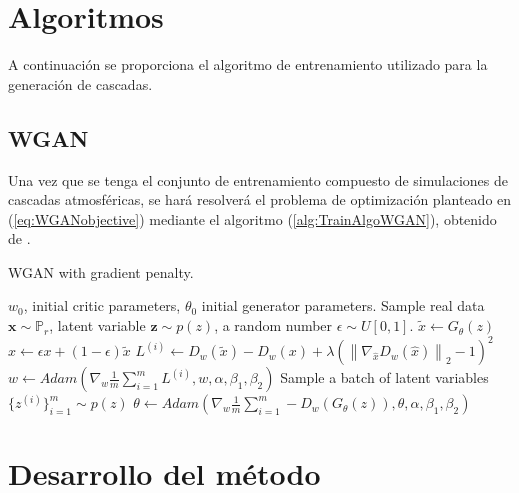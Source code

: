 \section{Algoritmos}

A continuación se proporciona el algoritmo de entrenamiento utilizado para la generación de cascadas.

\subsection{WGAN}

Una vez que se tenga el conjunto de entrenamiento compuesto de simulaciones de cascadas atmosféricas, se hará resolverá el problema de optimización planteado en (\ref{eq:WGANobjective}) mediante el algoritmo (\ref{alg:TrainAlgoWGAN}), obtenido de \parencite{Gulrajani2017}.

\begin{algorithm}
    \caption{WGAN with gradient penalty.}
    \label{alg:TrainAlgoWGAN}
    \begin{algorithmic}
        \Require $w_0$, initial critic parameters, $\theta_0$ initial generator parameters.
                    \State Sample real data $\textbf{x} \sim \mathbb{P}_r$, latent variable $\textbf{z} \sim p(z)$, a random number $\epsilon \sim U[0,1]$.
                    \State $\tilde{x} \gets G_\theta (z)$
                    \State $\hat{x} \gets \epsilon x + (1 - \epsilon)\tilde{x}$
                    \State $L^{(i)} \gets D_w(\tilde{x}) - D_w(x) + \lambda (\left\lVert \nabla_{\hat{x}}D_w(\hat{x})\right\rVert_{2} - 1 )^{2}$
                \EndFor
                \State $w \gets Adam(\nabla_w\frac{1}{m}\sum_{i=1}^mL^{(i)},w,\alpha,\beta_1,\beta_2)$
            \EndFor
            \State Sample a batch of latent variables $\{ z^{(i)}\} _{i=1}^m \sim p(z)$
            \State $\theta \gets Adam(\nabla_w\frac{1}{m}\sum_{i=1}^m-D_w(G_\theta(z)),\theta,\alpha,\beta_1,\beta_2)$
        \EndWhile
    \end{algorithmic}
\end{algorithm}

\section{Desarrollo del método}

